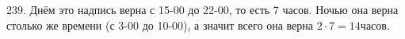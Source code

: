 239. Днём это надпись верна с 15-00 до 22-00, то есть 7 часов. Ночью она верна столько же времени (с 3-00 до 10-00), а значит всего она верна $2\cdot7=14$часов.\\

